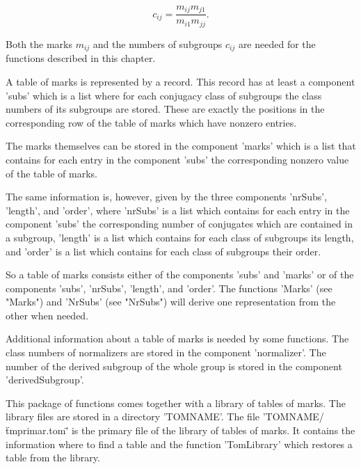 \[ c_{ij} = \frac{m_{ij} m_{j1}}{m_{i1} m_{jj}}. \]

Both the marks $m_{ij}$  and the numbers of subgroups $c_{ij}$ are needed
for the functions described in this chapter.


A table of marks is represented by a record.   This record has at least a
component  'subs' which is  a  list  where for each  conjugacy  class  of
subgroups the class  numbers  of its  subgroups  are  stored.  These  are
exactly  the positions in the  corresponding row of  the  table of  marks
which have nonzero entries.

The marks  themselves  can be stored in the component 'marks' which is  a
list   that  contains   for  each  entry  in  the  component  'subs'  the
corresponding nonzero value of the table of marks.

The same information is, however, given by the three components 'nrSubs',
'length', and  'order', where 'nrSubs' is a  list which contains for each
entry  in  the  component 'subs'  the  corresponding number of conjugates
which are contained in a subgroup,  'length' is a list which contains for
each class of subgroups its  length, and 'order' is a list which contains
for each class of subgroups their order.

So a table of marks consists either of the components 'subs' and  'marks'
or of  the  components  'subs',  'nrSubs',  'length', and  'order'.   The
functions 'Marks' (see  "Marks") and 'NrSubs' (see "NrSubs")  will derive
one representation from the other when needed.

Additional  information  about  a  table  of  marks  is  needed  by  some
functions.  The class  numbers of normalizers are stored in the component
'normalizer'.   The number of  the derived subgroup of the whole group is
stored in the component 'derivedSubgroup'.


This  package  of  functions comes together  with a library of tables  of
marks.   The library files are stored in a directory 'TOMNAME'.  The file
'TOMNAME/\"tmprimar.tom\"' is the  primary file of the library  of tables
of  marks.   It contains the  information where  to find  a table and the
function 'TomLibrary' which restores a table from the library.

